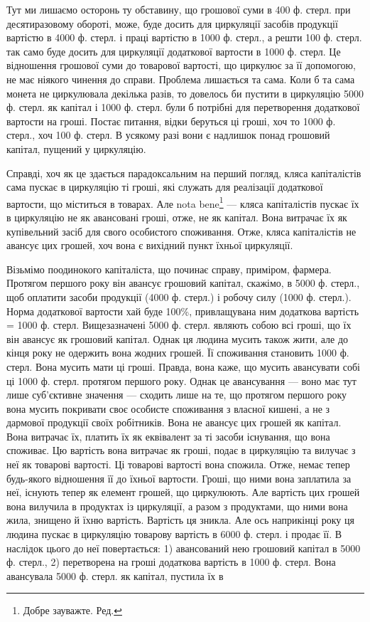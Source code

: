 Тут ми лишаємо осторонь ту обставину, що грошової суми в 400
ф. стерл. при десятиразовому обороті, може, буде досить для циркуляції
засобів продукції вартістю в 4000 ф. стерл. і праці вартістю в 1000 ф.
стерл., а решти 100 ф. стерл. так само буде досить для циркуляції додаткової
вартости в 1000 ф. стерл. Це відношення грошової суми до товарової
вартості, що циркулює за її допомогою, не має ніякого чинення до
справи. Проблема лишається та сама. Коли б та сама монета не циркулювала
декілька разів, то довелось би пустити в циркуляцію 5000 ф. стерл.
як капітал і 1000 ф. стерл. були б потрібні для перетворення додаткової
вартости на гроші. Постає питання, відки беруться ці гроші, хоч то
1000 ф. стерл., хоч 100 ф. стерл. В усякому разі вони є надлишок понад
грошовий капітал, пущений у циркуляцію.

Справді, хоч як це здається парадоксальним на перший погляд, кляса
капіталістів сама пускає в циркуляцію ті гроші, які служать для реалізації
додаткової вартости, що міститься в товарах. Але nota bene\footnote*{
Добре зауважте. Ред.
} — кляса
капіталістів пускає їх в циркуляцію не як авансовані гроші, отже, не як
капітал. Вона витрачає їх як купівельний засіб для свого особистого
споживання. Отже, кляса капіталістів не авансує цих грошей, хоч вона
є вихідний пункт їхньої циркуляції.

Візьмімо поодинокого капіталіста, що починає справу, приміром,
фармера. Протягом першого року він авансує грошовий капітал, скажімо,
в 5000 ф. стерл., щоб оплатити засоби продукції (4000 ф. стерл.) і робочу
силу (1000 ф. стерл.). Норма додаткової вартости хай буде 100\%, привлащувана
ним додаткова вартість = 1000 ф. стерл. Вищезазначені 5000 ф.
стерл. являють собою всі гроші, що їх він авансує як грошовий капітал.
Однак ця людина мусить також жити, але до кінця року не одержить
вона жодних грошей. Її споживання становить 1000 ф. стерл. Вона мусить
мати ці гроші. Правда, вона каже, що мусить авансувати собі ці 1000 ф. стерл.
протягом першого року. Однак це авансування — воно має тут лише
суб’єктивне значення — сходить лише на те, що протягом першого року
вона мусить покривати своє особисте споживання з власної кишені, а не
з дармової продукції своїх робітників. Вона не авансує цих грошей як
капітал. Вона витрачає їх, платить їх як еквівалент за ті засоби існування,
що вона споживає. Цю вартість вона витрачає як гроші, подає в
циркуляцію та вилучає з неї як товарові вартості. Ці товарові вартості
вона спожила. Отже, немає тепер будь-якого відношення її до їхньої
вартости. Гроші, що ними вона заплатила за неї, існують тепер як елемент
грошей, що циркулюють. Але вартість цих грошей вона вилучила
в продуктах із циркуляції, а разом з продуктами, що ними вона жила,
знищено й їхню вартість. Вартість ця зникла. Але ось наприкінці року
ця людина пускає в циркуляцію товарову вартість в 6000 ф. стерл. і продає її.
В наслідок цього до неї повертається: 1) авансований нею грошовий
капітал в 5000 ф. стерл., 2) перетворена на гроші додаткова вартість в
1000 ф. стерл. Вона авансувала 5000 ф. стерл. як капітал, пустила їх в
\parbreak{}  %
